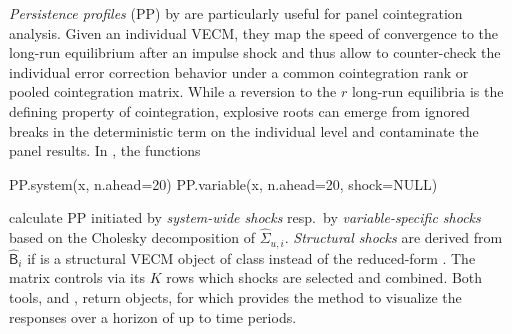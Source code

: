 \textit{Persistence profiles} (PP) by \citet{PesaranShin1996} are particularly useful for panel cointegration analysis. Given an individual VECM, they map the speed of convergence to the long-run equilibrium after an impulse shock and thus allow to counter-check the individual error correction behavior under a common cointegration rank or pooled cointegration matrix. While a reversion to the $r$ long-run equilibria is the defining property of cointegration, explosive roots can emerge from ignored breaks in the deterministic term on the individual level and contaminate the panel results. In , the functions 
\begin{CodeChunk}
\begin{CodeInput}
PP.system(x,   n.ahead=20)
PP.variable(x, n.ahead=20, shock=NULL)
\end{CodeInput}
\end{CodeChunk}
calculate PP initiated by \textit{system-wide shocks} resp.~by \textit{variable-specific shocks} based on the Cholesky decomposition of $ \widehat{\Sigma}_{u,i} $. \textit{Structural shocks} are derived from $ \widehat{\mathsf{B}}_i $ if  is a structural VECM object of class  instead of the reduced-form . The matrix  controls via its $K$ rows which shocks are selected and combined. Both tools,  and , return  objects, for which  provides the  method to visualize the responses over a horizon of up to  time periods.


